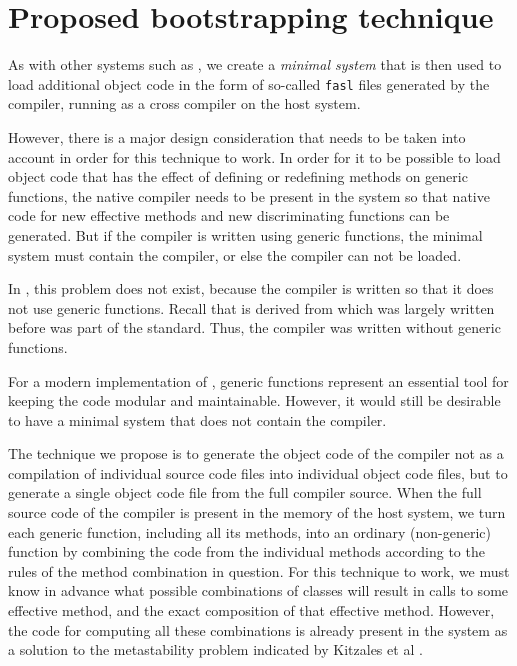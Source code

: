\section{Proposed bootstrapping technique}
\label{sec-our-technique}

As with other systems such as \sbcl{}, we create a \emph{minimal
  system} that is then used to load additional object code in the form
of so-called \texttt{fasl} files generated by the compiler, running as
a cross compiler on the host system.

However, there is a major design consideration that needs to be taken
into account in order for this technique to work.  In order for it to
be possible to load object code that has the effect of defining or
redefining methods on generic functions, the native compiler needs to
be present in the system so that native code for new effective methods
and new discriminating functions can be generated.  But if the
compiler is written using generic functions, the minimal system must
contain the compiler, or else the compiler can not be loaded.

In \sbcl{}, this problem does not exist, because the compiler is
written so that it does not use generic functions.  Recall that
\sbcl{} is derived from \cmucl{} which was largely written before
\clos{} was part of the \commonlisp{} standard.  Thus, the compiler
was written without generic functions.

For a modern implementation of \commonlisp{}, generic functions
represent an essential tool for keeping the code modular and
maintainable.  However, it would still be desirable to have a minimal
system that does not contain the compiler.

The technique we propose is to generate the object code of the
compiler not as a compilation of individual source code files into
individual object code files, but to generate a single object code
file from the full compiler source.  When the full source code of the
compiler is present in the memory of the host system, we turn each
generic function, including all its methods, into an ordinary
(non-generic) function by combining the code from the individual
methods according to the rules of the method combination in question.
For this technique to work, we must know in advance what possible
combinations of classes will result in calls to some effective method,
and the exact composition of that effective method.  However, the code
for computing all these combinations is already present in the system
as a solution \cite{Strandh:2014:RMI:2635648.2635656} to the
metastability problem indicated by Kitzales et al
\cite{Kiczales:1991:AMP:574212}.

\cite{Strandh:2015:ELS:Environments}
